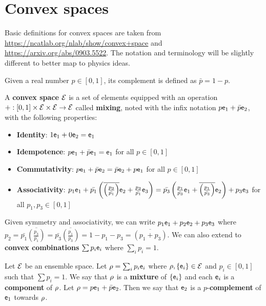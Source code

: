 \section{Convex spaces}

Basic definitions for convex spaces are taken from \url{https://ncatlab.org/nlab/show/convex+space} and \url{https://arxiv.org/abs/0903.5522}. The notation and terminology will be slightly different to better map to physics ideas. 

\begin{defn}
	Given a real number $p \in [0,1]$, its complement is defined as $\bar{p} = 1-p$.
\end{defn}

\begin{defn}
	A \textbf{convex space} $\Ens$ is a set of elements equipped with an operation $+ : [0, 1] \times \Ens \times \Ens \to \Ens$ called \textbf{mixing}, noted with the infix notation $p \ens_1 + \bar{p} \ens_2$, with the following properties:
	\begin{itemize}
		\item \textbf{Identity}: $1 \ens_1 + 0 \ens_2 = \ens_1$
		\item \textbf{Idempotence}:  $p \ens_1 + \bar{p} \ens_1 = \ens_1$ for all $p \in [0,1]$
		\item \textbf{Commutativity}: $p \ens_1 + \bar{p} \ens_2 = \bar{p} \ens_2 + p \ens_1$ for all $p \in [0,1]$
		\item \textbf{Associativity}: $p_1 \ens_1 + \bar{p_1}\left(\overline{\left(\frac{p_3}{\bar{p_1}}\right)}\ens_2 + \frac{p_3}{\bar{p_1}}\ens_3\right) =  \bar{p_3}\left(\frac{p_1}{\bar{p_3}} \ens_1 +  \overline{\left(\frac{p_1}{\bar{p_3}}\right)}\ens_2\right) + p_3 \ens_3$ for all $p_1, p_3 \in [0,1]$
	\end{itemize}
	Given symmetry and associativity, we can write $p_1 \ens_1 + p_2 \ens_2 + p_3 \ens_3$ where $p_2 = \bar{p_1}\overline{\left(\frac{p_3}{\bar{p_1}}\right)} = \bar{p_3}\overline{\left(\frac{p_1}{\bar{p_3}}\right)} = 1 - p_1 - p_3 = \overline{\left(p_1 + p_3\right)}$. We can also extend to \textbf{convex combinations} $\sum p_i \ens_i$ where $\sum_i p_i = 1$.
\end{defn}


\begin{defn}
	Let $\Ens$ be an ensemble space. Let $\ens[\rho] = \sum_i p_i \ens_i$ where $\ens[\rho], \{\ens_i\} \in \Ens$ and $p_i \in [0,1]$ such that $\sum p_i = 1$. We say that $\ens[\rho]$ is a \textbf{mixture} of $\{\ens_i\}$ and each $\ens_i$ is a \textbf{component} of $\ens[\rho]$. Let $\ens[\rho] = p \ens_1 + \bar{p} \ens_2$. Then we say that $\ens_2$ is a $p$-\textbf{complement} of $\ens_1$ towards $\ens[\rho]$.
\end{defn}

